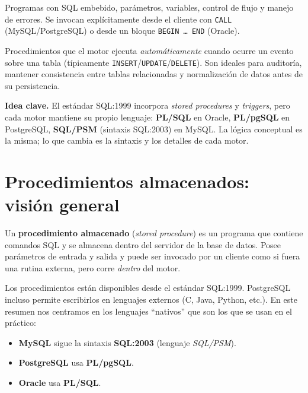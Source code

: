\documentclass[11pt,a4paper]{article}
\begin{document}
\begin{description}[leftmargin=2.4cm,style=nextline]
    \item[\textbf{Procedimientos y funciones almacenadas}]
    Programas con SQL embebido, parámetros, variables, control de
    flujo y manejo de errores. Se invocan explícitamente desde el
    cliente con \texttt{CALL} (MySQL/PostgreSQL) o desde un bloque
    \texttt{BEGIN \dots\ END} (Oracle).

    \item[\textbf{Triggers (disparadores)}]
    Procedimientos que el motor ejecuta \emph{automáticamente} cuando
    ocurre un evento sobre una tabla (típicamente
    \texttt{INSERT}/\texttt{UPDATE}/\texttt{DELETE}). Son ideales para
    auditoría, mantener consistencia entre tablas relacionadas y
    normalización de datos antes de su persistencia.
\end{description}

\begin{nota}
\textbf{Idea clave.} El estándar SQL:1999 incorpora \emph{stored
procedures} y \emph{triggers}, pero cada motor mantiene su propio
lenguaje: \textbf{PL/SQL} en Oracle, \textbf{PL/pgSQL} en PostgreSQL,
\textbf{SQL/PSM} (sintaxis SQL:2003) en MySQL. La lógica conceptual
es la misma; lo que cambia es la sintaxis y los detalles de cada
motor.
\end{nota}

\section{Procedimientos almacenados: visión general}

Un \textbf{procedimiento almacenado} (\emph{stored procedure}) es un
programa que contiene comandos SQL y se almacena dentro del servidor
de la base de datos. Posee parámetros de entrada y salida y puede ser
invocado por un cliente como si fuera una rutina externa, pero corre
\emph{dentro} del motor.

Los procedimientos están disponibles desde el estándar SQL:1999.
PostgreSQL incluso permite escribirlos en lenguajes externos (C,
Java, Python, etc.). En este resumen nos centramos en los lenguajes
``nativos'' que son los que se usan en el práctico:

\begin{itemize}
    \item \textbf{MySQL} sigue la sintaxis \textbf{SQL:2003} (lenguaje
    \emph{SQL/PSM}).
    \item \textbf{PostgreSQL} usa \textbf{PL/pgSQL}.
    \item \textbf{Oracle} usa \textbf{PL/SQL}.
\end{itemize}
\end{document}
